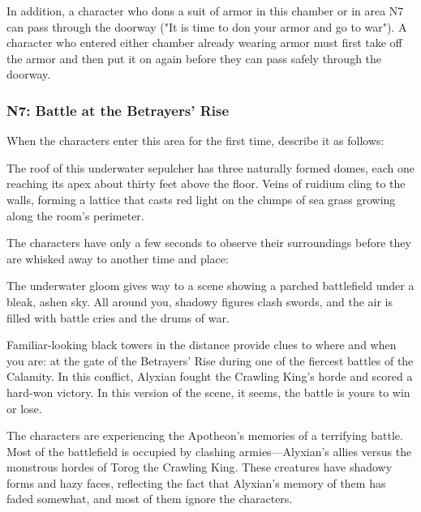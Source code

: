 \documentclass[10pt,a4paper,twoside,fancy,bg=print,twocolumn,openany,nodeprecatedcode]{dndbook}
\begin{document}
In addition, a character who dons a suit of armor in this chamber or in area N7 can pass through the doorway ("It is time to don your armor and go to war"). A character who entered either chamber already wearing armor must first take off the armor and then put it on again before they can pass safely through the doorway.

\subsubsection{N7: Battle at the Betrayers' Rise}
When the characters enter this area for the first time, describe it as follows:

\begin{DndReadAloud}{}
The roof of this underwater sepulcher has three naturally formed domes, each one reaching its apex about thirty feet above the floor. Veins of ruidium cling to the walls, forming a lattice that casts red light on the clumps of sea grass growing along the room's perimeter.

\end{DndReadAloud}

The characters have only a few seconds to observe their surroundings before they are whisked away to another time and place:

\begin{DndReadAloud}{}
The underwater gloom gives way to a scene showing a parched battlefield under a bleak, ashen sky. All around you, shadowy figures clash swords, and the air is filled with battle cries and the drums of war.

Familiar-looking black towers in the distance provide clues to where and when you are: at the gate of the Betrayers' Rise during one of the fiercest battles of the Calamity. In this conflict, Alyxian fought the Crawling King's horde and scored a hard-won victory. In this version of the scene, it seems, the battle is yours to win or lose.

\end{DndReadAloud}

The characters are experiencing the Apotheon's memories of a terrifying battle. Most of the battlefield is occupied by clashing armies—Alyxian's allies versus the monstrous hordes of Torog the Crawling King. These creatures have shadowy forms and hazy faces, reflecting the fact that Alyxian's memory of them has faded somewhat, and most of them ignore the characters.
\end{document}

